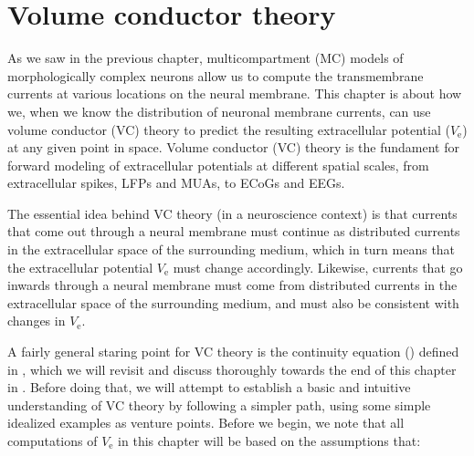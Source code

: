 \chapter{Volume conductor theory}
\label{chap:VC} %
As we saw in the previous chapter, multicompartment (MC) models of morphologically complex neurons 
allow us to compute the transmembrane currents at various locations on the neural membrane. 
This chapter is about how we, when we know the distribution of neuronal membrane currents, 
can use volume conductor (VC) theory to predict the resulting extracellular potential ($V_\mathrm{e}$) 
at any given point in space. Volume conductor (VC) theory is the fundament for forward modeling 
of extracellular potentials at different spatial scales, from extracellular spikes, 
LFPs and MUAs, to ECoGs and EEGs. 

The essential idea behind VC theory (in a neuroscience context) is that currents that come 
out through a neural membrane must continue as distributed currents in the extracellular space 
of the surrounding medium, which in turn means that the extracellular potential $V_\mathrm{e}$ 
must change accordingly. Likewise, currents that go inwards through a neural membrane must come 
from distributed currents in the extracellular space of the surrounding medium, and must also be consistent 
with changes in $V_\mathrm{e}$. 

A fairly general staring point for VC theory is the continuity equation () 
defined in , which we will revisit and discuss thoroughly towards the end of this 
chapter in . Before doing that, we will attempt to establish a basic and intuitive 
understanding of VC theory by following a simpler path, using some simple idealized examples as venture points. 
Before we begin, we note that all computations of $V_\mathrm{e}$ in this chapter
will be based on the assumptions that:

